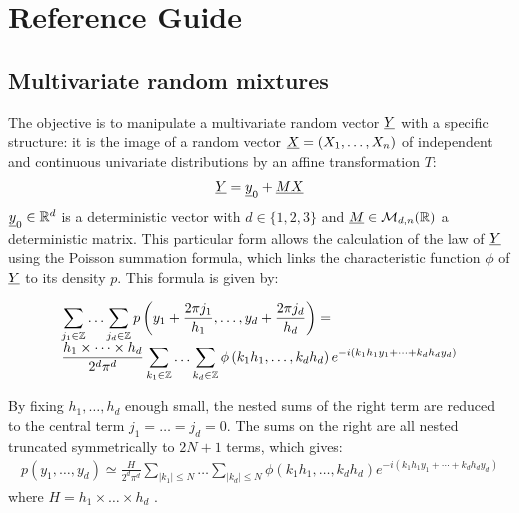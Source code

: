 



\section{Reference Guide}

\subsection{Multivariate random mixtures}

The objective is to manipulate a multivariate random vector ${\underline{Y}}$ with a specific structure:
it is the image of a random vector ${\underline{X}} = (X_1, \hdots, X_n) $ of independent and continuous univariate distributions by an affine transformation $T$:
\begin{align}\label{defY}
  {\underline{Y}}={\underline{y}}_0+{\underline{M}}{\underline{X}}
\end{align}
${\underline{y}}_0\in\mathbb{R}^d$ is a deterministic vector with $d\in\{1,2,3\}$ and ${\underline{M}}\in\mathcal{M}_{d,n}(\mathbb{R})$
a deterministic matrix. This particular form allows the calculation of the law of ${\underline{Y}} $ using the Poisson summation formula, which links the characteristic
function $\phi $ of ${\underline{Y}}$ to its density $p$. This formula is given by:

\begin{align}\label{poissonND}
  \begin{array}{p{\textwidth}}
    \multicolumn{1}{l}{\displaystyle\sum_{j_1\in\mathbb{Z}}\hdots\sum_{j_d\in\mathbb{Z}}p\left(y_1+\frac{2\pi j_1}{h_1},\hdots,y_d+\frac{2\pi j_d}{h_d}\right)= }\\
    \multicolumn{1}{r}{\displaystyle\frac{h_1\times\cdots\times h_d}{2^d\pi^d}\sum_{k_1\in\mathbb{Z}}\hdots\sum_{k_d\in\mathbb{Z}}\phi\left(k_1h_1,\hdots,k_dh_d\right)e^{-i(k_1h_1y_1+\cdots+k_dh_dy_d)}}
  \end{array}
\end{align}

By fixing $h_1,\hdots,h_d$ enough small, the nested sums of the right term are reduced to the central term $j_1=\hdots=j_d = 0$.
The sums on the right are all nested truncated symmetrically to $ 2N +1 $ terms, which gives:
\begin{align}
  p\left(y_1,\hdots,y_d\right)\simeq\frac{H}{2^d\pi^d}\sum_{|k_1|\leq N}\hdots\sum_{|k_d|\leq N}\phi\left(k_1h_1,\hdots,k_dh_d\right)e^{-i(k_1h_1y_1+\cdots+k_dh_dy_d)}
\end{align}
where $H = h_1\times\hdots\times h_d$ .

